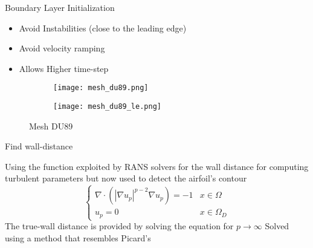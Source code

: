 \begin{frame}{Boundary Layer Initialization}
    \begin{itemize}
    \item Avoid Instabilities (close to the leading edge)
    \item Avoid velocity ramping
    \item Allows Higher time-step
    \end{itemize}


    \begin{figure}[h]
        \centering          
        \begin{subfigure}[h]{0.45\textwidth}
                 \centering
            \texttt{[image: mesh\_du89.png]}
       \end{subfigure}
             \hfill
        \begin{subfigure}[h]{0.45\textwidth}
         \centering
            \texttt{[image: mesh\_du89\_le.png]}
        \end{subfigure}
        \caption{Mesh DU89}
        \end{figure} 
\end{frame}



\begin{frame}{Find wall-distance}

    Using the function exploited by RANS solvers for the wall distance for computing turbulent parameters but now used to detect the airfoil's contour
    \begin{equation}
    \begin{cases}
        \nabla \cdot (|\nabla u_p|^{p-2} \nabla u_p) = -1 & x\in \Omega\\
        u_p = 0 & x\in \Omega_D
        \end{cases}
        \label{equ:ppoisson}
    \end{equation}
    The true-wall distance is provided by solving the equation for $p\xrightarrow{}\infty$
    Solved using a method that resembles Picard's
    \end{frame}
    

